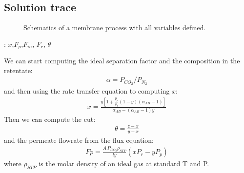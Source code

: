 \documentclass[letterpaper,10pt,english]{jupyterBook}
\let\sphinxpxdimen\pdfpxdimen\else\newdimen\sphinxpxdimen
\begin{document}
\subsection{Solution trace}
\label{\detokenize{Exercise_W2_2025:solution-trace}}
\begin{figure}[htbp]
\centering
\capstart

\noindent\sphinxincludegraphics[height=300\sphinxpxdimen]{{scheme}.png}
\caption{Schematics of a membrane process with all variables defined.}\label{\detokenize{Exercise_W2_2025:scheme}}\end{figure}



\sphinxAtStartPar
{}:
\(x\),\(F_{p}\),\(F_{in}\), \(F_{r}\), \(\theta\)

\sphinxAtStartPar
We can start computing the ideal separation factor and the composition in the retentate:
\begin{equation*}
\begin{split}
\alpha=P_{CO_2}/P_{N_2}
\end{split}
\end{equation*}
\sphinxAtStartPar
and then using the rate transfer equation to computing \(x\):
\begin{equation*}
\begin{split}
x=\frac{y\left[1+\frac{p_p}{p_r}(1-y)\left(\alpha_{AB}-1\right)\right]}{\alpha_{AB}-\left(\alpha_{AB}-1\right)y}
\end{split}
\end{equation*}
\sphinxAtStartPar
Then we can compute the cut:
\begin{equation*}
\begin{split}
\theta=\frac{z-x}{y-x}
\end{split}
\end{equation*}
\sphinxAtStartPar
and the permeate flowrate from the flux equation:
\begin{equation*}
\begin{split}
Fp=\frac{A\,P_{CO_2}\rho_{STP}}{l y}\left(xP_r-yP_p\right)
\end{split}
\end{equation*}
\sphinxAtStartPar
where \(\rho_{STP}\) is the molar density of an ideal gas at standard T and P.
\end{document}
